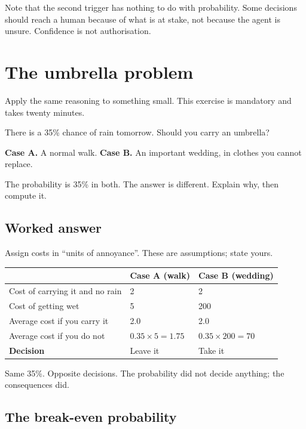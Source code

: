 \documentclass[11pt,a4paper]{article}
\begin{document}
Note that the second trigger has nothing to do with probability. Some decisions should reach a
human because of what is at stake, not because the agent is unsure. Confidence is not
authorisation.

\section{The umbrella problem}
\label{sec:umbrella}

Apply the same reasoning to something small. This exercise is mandatory and takes twenty
minutes.

There is a 35\% chance of rain tomorrow. Should you carry an umbrella?

\textbf{Case A.} A normal walk. \quad \textbf{Case B.} An important wedding, in clothes you
cannot replace.

The probability is 35\% in both. The answer is different. Explain why, then compute it.

\subsection{Worked answer}

Assign costs in ``units of annoyance''. These are assumptions; state yours.

\begin{center}
\begin{tabular}{@{}L{5.2cm}C{3.2cm}C{3.2cm}@{}}
\toprule
& \textbf{Case A (walk)} & \textbf{Case B (wedding)} \\
\midrule
Cost of carrying it and no rain & 2 & 2 \\
Cost of getting wet             & 5 & 200 \\
\midrule
Average cost if you carry it & 2.0 & 2.0 \\
Average cost if you do not & $0.35 \times 5 = 1.75$ & $0.35 \times 200 = 70$ \\
\midrule
\textbf{Decision}               & Leave it & Take it \\
\bottomrule
\end{tabular}
\end{center}

Same 35\%. Opposite decisions. The probability did not decide anything; the consequences did.

\subsection{The break-even probability}
\end{document}
